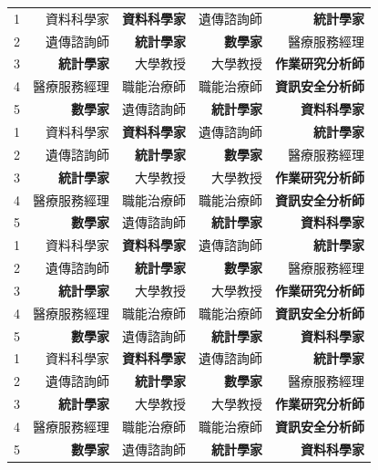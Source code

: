 \documentclass[utf8,12pt]{article} %
\begin{document}
\begin{longtable}{@{}crrrr@{}}
1 & { 資料科學家} & \textbf{資料科學家}  &  遺傳諮詢師 & \textbf{統計學家} \\
2 & 遺傳諮詢師 & \textbf{統計學家} & \textbf{數學家}  & 醫療服務經理 \\
3 & \textbf{統計學家} & 大學教授  & 大學教授 & \textbf{作業研究分析師}\\
4 & 醫療服務經理 & 職能治療師  & 職能治療師 & \textbf{資訊安全分析師} \\
5 & \textbf{數學家} & 遺傳諮詢師 & \textbf{統計學家} & \textbf{資料科學家} \\
1 & { 資料科學家} & \textbf{資料科學家}  &  遺傳諮詢師 & \textbf{統計學家} \\
2 & 遺傳諮詢師 & \textbf{統計學家} & \textbf{數學家}  & 醫療服務經理 \\
3 & \textbf{統計學家} & 大學教授  & 大學教授 & \textbf{作業研究分析師}\\
4 & 醫療服務經理 & 職能治療師  & 職能治療師 & \textbf{資訊安全分析師} \\
5 & \textbf{數學家} & 遺傳諮詢師 & \textbf{統計學家} & \textbf{資料科學家} \\
1 & { 資料科學家} & \textbf{資料科學家}  &  遺傳諮詢師 & \textbf{統計學家} \\
2 & 遺傳諮詢師 & \textbf{統計學家} & \textbf{數學家}  & 醫療服務經理 \\
3 & \textbf{統計學家} & 大學教授  & 大學教授 & \textbf{作業研究分析師}\\
4 & 醫療服務經理 & 職能治療師  & 職能治療師 & \textbf{資訊安全分析師} \\
5 & \textbf{數學家} & 遺傳諮詢師 & \textbf{統計學家} & \textbf{資料科學家} \\
1 & { 資料科學家} & \textbf{資料科學家}  &  遺傳諮詢師 & \textbf{統計學家} \\
2 & 遺傳諮詢師 & \textbf{統計學家} & \textbf{數學家}  & 醫療服務經理 \\
3 & \textbf{統計學家} & 大學教授  & 大學教授 & \textbf{作業研究分析師}\\
4 & 醫療服務經理 & 職能治療師  & 職能治療師 & \textbf{資訊安全分析師} \\
5 & \textbf{數學家} & 遺傳諮詢師 & \textbf{統計學家} & \textbf{資料科學家} \\
\midrule
\bottomrule
\end{longtable}
%
%
\end{document}

